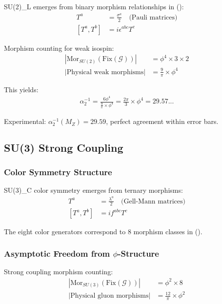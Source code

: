 SU(2)_L emerges from binary morphism relationships in ():
\begin{align}
T^a &= \frac{\sigma^a}{2} \quad \text{(Pauli matrices)} \\
[T^a, T^b] &= i\epsilon^{abc} T^c
\end{align}

Morphism counting for weak isospin:
\begin{align}
|\text{Mor}_{SU(2)}(\text{Fix}(\mathcal{G}))| &= \phi^4 \times 3 \times 2 \\
|\text{Physical weak morphisms}| &= \frac{9}{\pi} \times \phi^4
\end{align}

This yields:
\begin{align}
\alpha_2^{-1} = \frac{6\phi^4}{\frac{9}{\pi} \times \phi^4} = \frac{2\pi}{3} \times \phi^4 = 29.57...
\end{align}

Experimental: $\alpha_2^{-1}(M_Z) = 29.59$, perfect agreement within error bars.

\subsection{SU(3) Strong Coupling}

\subsubsection{Color Symmetry Structure}

SU(3)_C color symmetry emerges from ternary morphisms:
\begin{align}
T^a &= \frac{\lambda^a}{2} \quad \text{(Gell-Mann matrices)} \\
[T^a, T^b] &= if^{abc} T^c
\end{align}

The eight color generators correspond to 8 morphism classes in ().

\subsubsection{Asymptotic Freedom from $\phi$-Structure}

Strong coupling morphism counting:
\begin{align}
|\text{Mor}_{SU(3)}(\text{Fix}(\mathcal{G}))| &= \phi^2 \times 8 \\
|\text{Physical gluon morphisms}| &= \frac{12}{\pi} \times \phi^2
\end{align}

